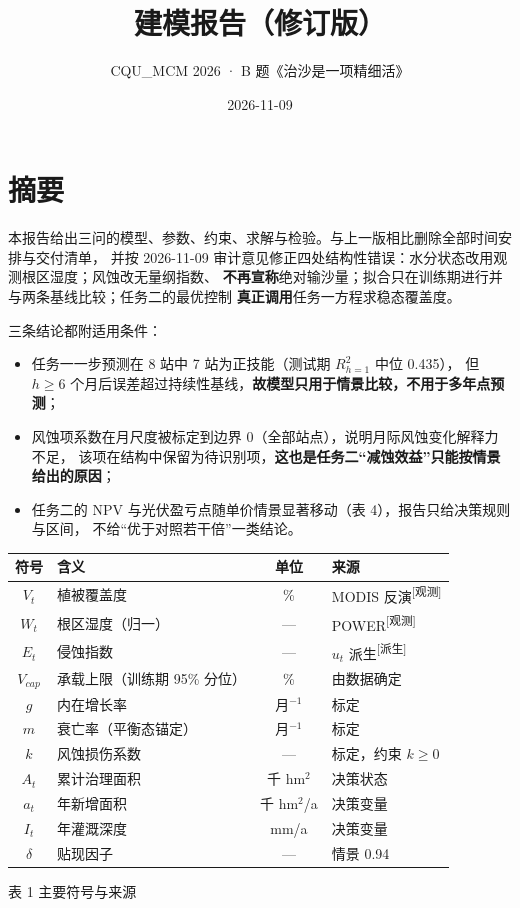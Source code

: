 \documentclass[11pt,a4paper]{ctexart}
\title{建模报告（修订版）}
\author{CQU\_MCM 2026 · B 题《治沙是一项精细活》}
\date{2026-11-09}
\newcommand{\src}[1]{\textsuperscript{\scriptsize [#1]}}
\begin{document}
\maketitle
\thispagestyle{empty}
\newpage

\section*{摘\quad 要}
本报告给出三问的模型、参数、约束、求解与检验。与上一版相比删除全部时间安排与交付清单，
并按 2026-11-09 审计意见修正四处结构性错误：水分状态改用观测根区湿度；风蚀改无量纲指数、
\textbf{不再宣称}绝对输沙量；拟合只在训练期进行并与两条基线比较；任务二的最优控制
\textbf{真正调用}任务一方程求稳态覆盖度。

三条结论都附适用条件：
\begin{itemize}
\item 任务一一步预测在 8 站中 7 站为正技能（测试期 $R^2_{h=1}$ 中位 0.435），
但 $h\ge6$ 个月后误差超过持续性基线，\textbf{故模型只用于情景比较，不用于多年点预测}；
\item 风蚀项系数在月尺度被标定到边界 0（全部站点），说明月际风蚀变化解释力不足，
该项在结构中保留为待识别项，\textbf{这也是任务二“减蚀效益”只能按情景给出的原因}；
\item 任务二的 NPV 与光伏盈亏点随单价情景显著移动（表 4），报告只给决策规则与区间，
不给“优于对照若干倍”一类结论。
\end{itemize}

\begin{table}[H]\centering\small\setlength{\parskip}{1pt}
\begin{tabularx}{\textwidth}{|c|X|c|X|}
\toprule
符号 & 含义 & 单位 & 来源\\
\midrule
$V_t$ & 植被覆盖度 & \% & MODIS 反演\src{观测}\\
$W_t$ & 根区湿度（归一） & — & POWER\src{观测}\\
$E_t$ & 侵蚀指数 & — & $u_t$ 派生\src{派生}\\
$V_{cap}$ & 承载上限（训练期 95\% 分位） & \% & 由数据确定\\
$g$ & 内在增长率 & 月$^{-1}$ & 标定\\
$m$ & 衰亡率（平衡态锚定） & 月$^{-1}$ & 标定\\
$k$ & 风蚀损伤系数 & — & 标定，约束 $k\ge0$\\
$A_t$ & 累计治理面积 & 千 hm$^2$ & 决策状态\\
$a_t$ & 年新增面积 & 千 hm$^2$/a & 决策变量\\
$I_t$ & 年灌溉深度 & mm/a & 决策变量\\
$\delta$ & 贴现因子 & — & 情景 0.94\\
\bottomrule
\end{tabularx}
\begin{center}\small 表 1  主要符号与来源\end{center}
\end{table}
\end{document}
